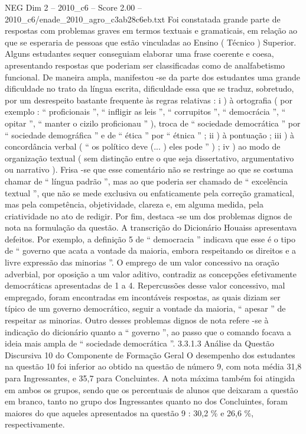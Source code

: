 \begin{textsample}{NEG Dim 2 – 2010\_c6 – Score 2.00 – 2010\_c6/enade\_2010\_agro\_c3ab28c6eb.txt}
Foi constatada grande parte de respostas com problemas graves em termos textuais e gramaticais, em relação ao que se esperaria de pessoas que estão vinculadas ao Ensino ( Técnico ) Superior.
Alguns estudantes sequer conseguiam elaborar uma frase coerente e coesa, apresentando respostas que poderiam ser classificadas como de analfabetismo funcional.
De maneira ampla, manifestou -se da parte dos estudantes uma grande dificuldade no trato da língua escrita, dificuldade essa que se traduz, sobretudo, por um desrespeito bastante frequente às regras relativas : i ) à ortografia ( por exemplo : “ proficionais ”, “ infligir as leis ”, “ corrupitos ”, “ democrácia ”, “ opitar ”, “ manter o cizilo proficionau ” ), troca de “ sociedade democrática ” por “ sociedade demográfica ” e de “ ética ” por “ étnica ” ; ii ) à pontuação ; iii ) à concordância verbal ( “ os político deve (... ) eles pode ” ) ; iv ) ao modo de organização textual ( sem distinção entre o que seja dissertativo, argumentativo ou narrativo ).
Frisa -se que esse comentário não se restringe ao que se costuma chamar de “ língua padrão ”, mas ao que poderia ser chamado de “ excelência textual ”, que não se mede exclusiva ou enfaticamente pela correção gramatical, mas pela competência, objetividade, clareza e, em alguma medida, pela criatividade no ato de redigir.
Por fim, destaca -se um dos problemas dignos de nota na formulação da questão.
A transcrição do Dicionário Houaiss apresentava defeitos.
Por exemplo, a definição 5 de “ democracia ” indicava que esse é o tipo de “ governo que acata a vontade da maioria, embora respeitando os direitos e a livre expressão das minorias ”.
O emprego de um valor concessivo na oração adverbial, por oposição a um valor aditivo, contradiz as concepções efetivamente democráticas apresentadas de 1 a 4.
Repercussões desse valor concessivo, mal empregado, foram encontradas em incontáveis respostas, as quais diziam ser típico de um governo democrático, seguir a vontade da maioria, “ apesar ” de respeitar as minorias.
Outro desses problemas dignos de nota refere -se à indicação do dicionário quanto a “ governo ”, ao passo que o comando focava a ideia mais ampla de “ sociedade democrática ”. 3.3.1.3 Análise da Questão Discursiva 10 do Componente de Formação Geral O desempenho dos estudantes na questão 10 foi inferior ao obtido na questão de número 9, com nota média 31,8 para Ingressantes, e 35,7 para Concluintes.
A nota máxima também foi atingida em ambos os grupos, sendo que os percentuais de alunos que deixaram a questão em branco, tanto no grupo dos Ingressantes quanto no dos Concluintes, foram maiores do que aqueles apresentados na questão 9 : 30,2 \% e 26,6 \%, respectivamente.

\end{textsample}
